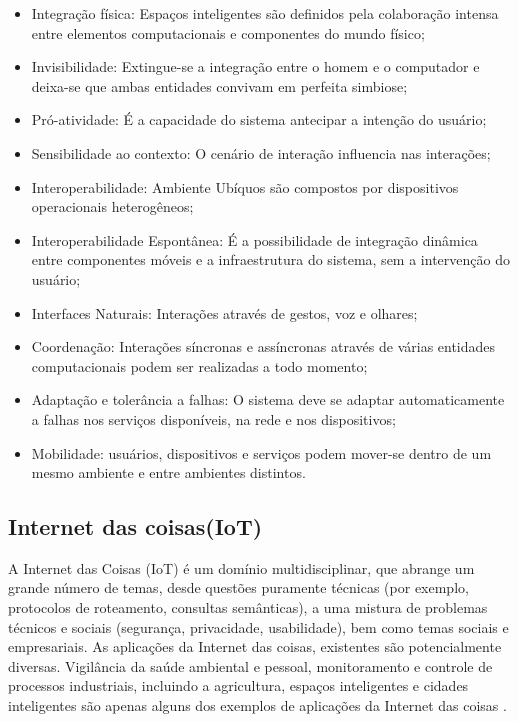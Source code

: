  \begin{itemize}
   \item Integração física: Espaços inteligentes são definidos pela colaboração intensa entre elementos computacionais e componentes do mundo físico;
   \item Invisibilidade: Extingue-se a integração entre o homem e o computador e deixa-se que ambas entidades convivam em perfeita simbiose;
   \item Pró-atividade: É a capacidade do sistema antecipar a intenção do usuário;
   \item Sensibilidade ao contexto: O cenário de interação influencia nas interações;
   \item Interoperabilidade: Ambiente Ubíquos são compostos por dispositivos operacionais heterogêneos;
   \item Interoperabilidade Espontânea: É a possibilidade de integração dinâmica entre componentes móveis e a infraestrutura do sistema, sem a intervenção do usuário;
   \item Interfaces Naturais: Interações através de gestos, voz e olhares;
   \item Coordenação: Interações síncronas e assíncronas através de várias entidades computacionais podem ser realizadas a todo momento;
   \item Adaptação e tolerância a falhas: O sistema deve se adaptar automaticamente a falhas nos serviços disponíveis, na rede e nos dispositivos;
   \item Mobilidade: usuários, dispositivos e serviços podem mover-se dentro de um mesmo ambiente e entre ambientes distintos.
 \end{itemize}

\subsection{Internet das coisas(IoT)}\label{iot}

A Internet das Coisas (IoT) é um domínio multidisciplinar, que abrange um grande número de temas, desde questões puramente técnicas (por exemplo, protocolos de roteamento, consultas semânticas), a uma mistura de problemas técnicos e sociais (segurança, privacidade, usabilidade), bem como temas sociais e empresariais. As aplicações da Internet das coisas, existentes são potencialmente diversas. Vigilância da saúde ambiental e pessoal, monitoramento e controle de processos industriais, incluindo a agricultura, espaços inteligentes e cidades inteligentes são apenas alguns dos exemplos de aplicações da Internet das coisas \cite{krishnakumarframework}.
